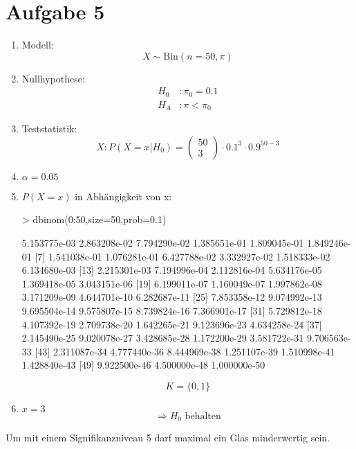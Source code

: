 

\section{Aufgabe 5}
\begin{enumerate}
  \item Modell: \\
        \[ X \sim \text{Bin}(n=50,\pi) \]
  \item Nullhypothese: 
        \[ \begin{array}{ll}
          H_0 &: \pi_0 = 0.1 \\
          H_A &: \pi < \pi_0
        \end{array} \]
  \item Teststatistik: 
        \[ X: P(X=x | H_0) 
        = \left( \begin{array}{l}50\\3\end{array} \right) 
        \cdot 0.1^3 \cdot 0.9^{50 - 3} \]
  \item $\alpha = 0.05$
  \item $P(X=x)$ in Abhängigkeit von x: 
\begin{Schunk}
\begin{Sinput}
> dbinom(0:50,size=50,prob=0.1)
\end{Sinput}
\begin{Soutput}
 [1] 5.153775e-03 2.863208e-02 7.794290e-02 1.385651e-01 1.809045e-01 1.849246e-01
 [7] 1.541038e-01 1.076281e-01 6.427788e-02 3.332927e-02 1.518333e-02 6.134680e-03
[13] 2.215301e-03 7.194996e-04 2.112816e-04 5.634176e-05 1.369418e-05 3.043151e-06
[19] 6.199011e-07 1.160049e-07 1.997862e-08 3.171209e-09 4.644701e-10 6.282687e-11
[25] 7.853358e-12 9.074992e-13 9.695504e-14 9.575807e-15 8.739824e-16 7.366901e-17
[31] 5.729812e-18 4.107392e-19 2.709738e-20 1.642265e-21 9.123696e-23 4.634258e-24
[37] 2.145490e-25 9.020078e-27 3.428685e-28 1.172200e-29 3.581722e-31 9.706563e-33
[43] 2.311087e-34 4.777440e-36 8.444969e-38 1.251107e-39 1.510998e-41 1.428840e-43
[49] 9.922500e-46 4.500000e-48 1.000000e-50
\end{Soutput}
\end{Schunk}
        \[ K = \lbrace 0, 1 \rbrace \]
  \item $x=3$\\
        \[ \Rightarrow H_0 \text{ behalten} \]
\end{enumerate}
Um mit einem Signifikanzniveau 5 darf maximal ein Glas minderwertig sein. 
